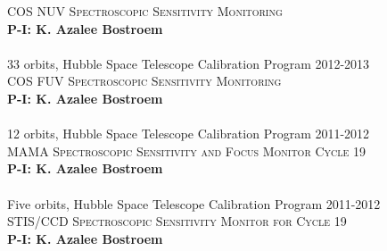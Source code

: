 \documentclass[10pt]{cv}
\begin{document}
\begin{llist}
\textsc{COS NUV Spectroscopic Sensitivity Monitoring}\\
{\bf P-I: K. Azalee Bostroem} \\ %
\\
33 orbits, Hubble Space Telescope Calibration Program \hfill 2012-2013\\ %
\textsc{COS FUV Spectroscopic Sensitivity Monitoring}\\
{\bf P-I: K. Azalee Bostroem} \\ %
\\
12 orbits, Hubble Space Telescope Calibration Program \hfill 2011-2012\\ %
\textsc{MAMA Spectroscopic Sensitivity and Focus Monitor Cycle 19}\\
{\bf P-I: K. Azalee Bostroem} \\ %
\\
Five orbits, Hubble Space Telescope Calibration Program \hfill 2011-2012\\ %
\textsc{STIS/CCD Spectroscopic Sensitivity Monitor for Cycle 19}\\
{\bf P-I: K. Azalee Bostroem} \\ %


\end{llist}
\end{document}
